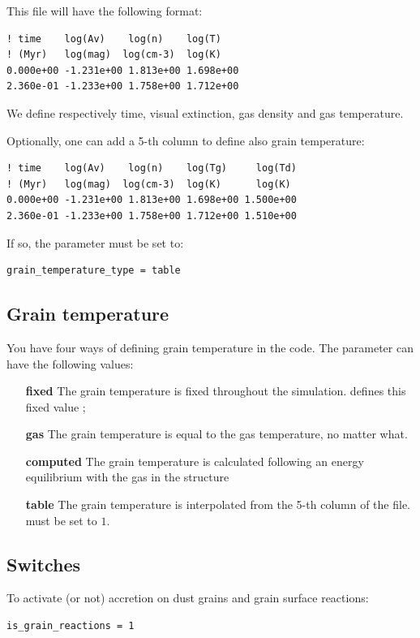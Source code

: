 \documentclass[english,a4paper,twoside]{article}
\begin{document}
This file will have the following format:
\begin{verbatim}
! time    log(Av)    log(n)    log(T)
! (Myr)   log(mag)  log(cm-3)  log(K)
0.000e+00 -1.231e+00 1.813e+00 1.698e+00
2.360e-01 -1.233e+00 1.758e+00 1.712e+00
\end{verbatim}
We define respectively time, visual extinction, gas density and gas temperature. 

Optionally, one can add a 5-th column to define also grain temperature:
\begin{verbatim}
! time    log(Av)    log(n)    log(Tg)     log(Td)
! (Myr)   log(mag)  log(cm-3)  log(K)      log(K)
0.000e+00 -1.231e+00 1.813e+00 1.698e+00 1.500e+00
2.360e-01 -1.233e+00 1.758e+00 1.712e+00 1.510e+00
\end{verbatim}
If so, the parameter  must be set to:
\begin{verbatim}
grain_temperature_type = table
\end{verbatim}

\subsection{Grain temperature}
You have four ways of defining grain temperature in the code. The parameter  can have the following values:
\begin{itemize}
\item[\textbf{fixed}] The grain temperature is fixed throughout the simulation.  defines this fixed value ;
\item[\textbf{gas}] The grain temperature is equal to the gas temperature, no matter what.
\item[\textbf{computed}] The grain temperature is calculated following an energy equilibrium with the gas in the structure
\item[\textbf{table}] The grain temperature is interpolated from the 5-th column of the   file.  must be set to $1$.
\end{itemize}

\subsection{Switches}
To activate (or not) accretion on dust grains and grain surface reactions:
\begin{verbatim}
is_grain_reactions = 1
\end{verbatim}
\end{document}
